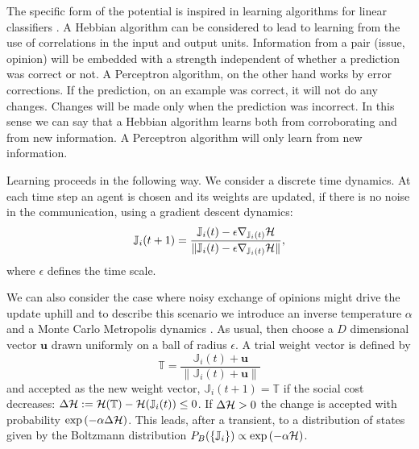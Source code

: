 \documentclass[twocolumn,showpacs]{revtex4-1}
\begin{document}
The specific form of the potential is inspired in 
learning algorithms for linear classifiers \cite{Engel,Vicente}. A Hebbian
algorithm can  be considered to lead to learning 
from the use of  correlations in the input and output 
units. Information from a pair (issue, opinion) 
will be embedded with a strength 
independent of whether a prediction was correct or not.
A Perceptron algorithm, on the other hand works by error
corrections. If the prediction, on an example was correct, 
it will not do any changes. Changes will be made only when 
the prediction was incorrect. In this sense we can say that
a Hebbian algorithm learns both from corroborating 
and from new information. A Perceptron algorithm will only 
learn from new information. 



Learning proceeds in the following way. We consider a discrete time dynamics. 
At each time step an agent is chosen and its weights are updated, if
there is no noise in the communication, using  a gradient descent dynamics:
\begin{equation}
\mathbb{J}_i(t+1)= \frac{\mathbb{J}_i(t)-\epsilon \nabla_{\mathbb{J}_i(t)}{\cal H}} 
                                               {\| \mathbb{J}_i(t)- \epsilon \nabla_{\mathbb{J}_i(t)}{\cal H}    \| }, 
\label{noiseless}
\end{equation}
where $\epsilon$ defines the time scale. 


We can also consider the case where noisy exchange of 
opinions  might drive the update uphill and to describe this scenario we 
introduce  an inverse temperature $\alpha$ and
a Monte Carlo Metropolis dynamics \cite{Newman99}. As usual, then choose a
 $D$ dimensional vector  $\mathbf{u} $ drawn  uniformly 
on a ball of radius $\epsilon$.   
A trial weight vector is defined by
\begin{equation}
\mathbb{T}=\frac{\mathbb{J}_i(t) +\mathbf{u}}{\| \mathbb{J}_i(t) +\mathbf{u} \|} 
\end{equation}
and accepted as the new weight vector, 
 $\mathbb{J}_i(t+1)=\mathbb{T}$ if 
the social cost decreases: $\Delta {\cal H}:= {\cal H}(\mathbb{T})- 
{\cal H}(\mathbb{J}_i(t)) \le 0$. If  $\Delta {\cal H} > 0 $
the change is accepted with probability $ \exp \left(-\alpha\Delta {\cal H} \right)$.
This leads, after a transient, to a distribution
of states given by the Boltzmann distribution
$P_B(\{\mathbb{J}_i\}) \propto \exp\left( -\alpha {\cal H}\right)$. 
\end{document}
